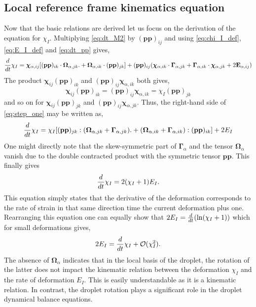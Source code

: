 \subsection{Local reference frame kinematics equation}

Now that the basic relations are derived let us focus on the derivation of the equation for $\chi_I$. 
Multiplying \ref{eq:dt_M2} by $(\textbf{pp})_{ij}$ and using \ref{eq:chi_I_def},\ref{eq:E_I_def} and  \ref{eq:dt_pp} gives, 
\begin{equation}
    \ddt \chi_I
    = 
    \bm\chi_{\alpha,ij} [(\textbf{pp})_{ik}\cdot\bm\Omega_{\alpha,jk}. 
    +\bm\Omega_{\alpha,ik}\cdot (\textbf{pp})_{jk}]
    + (\textbf{pp})_{ij}(\bm\chi_{\alpha,ik} \cdot \bm\Gamma_{\alpha,jk}
    + \bm\Gamma_{\alpha,ik} \cdot \bm\chi_{\alpha,jk}
    + 2\textbf{E}_{\alpha,ij})
    \label{eq:step_one}
\end{equation}
The product $\bm\chi_{ij} (\textbf{pp})_{ik}$ and $(\textbf{pp})_{ij}\bm\chi_{\alpha,ik}$ both gives, 
\begin{equation*}
    \bm\chi_{ij} (\textbf{pp})_{ik}
    =
    (\textbf{pp})_{ij}\bm\chi_{\alpha,ik}
    = 
    \chi_I (\textbf{pp})_{jk}
\end{equation*}
and so on for $\bm\chi_{ij} (\textbf{pp})_{jk}$ and $(\textbf{pp})_{ij} \bm\chi_{\alpha,jk}$. 
Thus, the right-hand side of \ref{eq:step_one} may be written as, 
\begin{equation}
    \ddt \chi_I
    = 
    \chi_I [(\textbf{pp})_{jk}:(\bm\Omega_{\alpha,jk} + \bm\Gamma_{\alpha,jk}). 
    +(\bm\Omega_{\alpha,ik} + \bm\Gamma_{\alpha,ik}) :(\textbf{pp})_{ik}]
    + 2E_I
    \label{eq:step_two}
\end{equation}
One might directly note that the skew-symmetric part of $\bm\Gamma_\alpha$ and the tensor $\bm\Omega_\alpha$ vanish due to the double contracted product with the symmetric tensor $\textbf{pp}$. 
This finally gives 
\begin{equation}
    \ddt \chi_I
    = 
    2(\chi_I +1)E_I. 
    \label{eq:dt_chi_I}
\end{equation}
This equation simply states that the derivative of the deformation corresponds to the rate of strain in that same direction time the current deformation plus one.  
Rearranging this equation one can equally show that $2E_I = \frac{d}{dt} (\ln(\chi_I+1))$ which for small deformations gives,
\begin{equation}
    2E_I =  \ddt \chi_I + \mathcal{O}(\chi_I^2). 
    \label{eq:small_def}
\end{equation}
The absence of $\bm\Omega_\alpha$ indicates that in the local basis of the droplet, the rotation of the latter does not impact the kinematic relation between the deformation $\chi_I$ and the rate of deformation $E_I$.
This is easily understandable as it is a kinematic relation. 
In contrast, the droplet rotation plays a significant role in the droplet dynamical balance equations.


